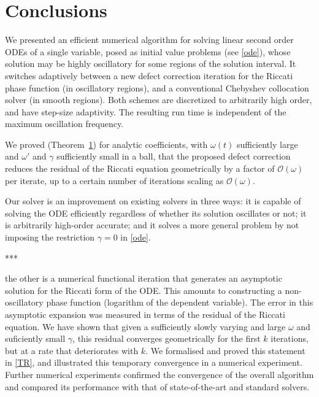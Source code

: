 \documentclass[10pt]{article}
\newcommand{\bigO}{{\mathcal O}}
\newcommand{\om}{\omega}
\newcommand{\g}{\gamma}
\begin{document}
\section{Conclusions \label{conclusions}}

We presented an efficient numerical algorithm for solving linear second order
ODEs of a single variable, posed as initial value problems (see \cref{ode}),
whose solution
may be highly oscillatory for some regions of the solution interval.
It switches adaptively between a new defect correction iteration for
the Riccati phase function (in oscillatory regions), and
a conventional Chebyshev collocation solver (in smooth regions).
Both schemes are discretized to arbitrarily high order, and
have step-size adaptivity.
The resulting run time is independent of the maximum oscillation frequency.

We proved (Theorem~\ref{}) for analytic coefficients, with
$\om(t)$ sufficiently large and $\om'$ and $\g$ sufficiently small in a ball,
that the proposed defect correction reduces the residual of the Riccati
equation geometrically by a factor of $\bigO(\om)$ per iterate,
up to a certain number of iterations scaling as $\bigO(\om)$.


Our solver is an improvement on existing solvers
in three ways: it is capable of solving the ODE efficiently regardless of
whether its solution oscillates or not; it is arbitrarily high-order accurate;
and it solves a more general problem by not imposing the restriction $\gamma =
0$ in \cref{ode}.

***

the other is a numerical functional iteration that generates an asymptotic
solution for the Riccati form of the ODE. This amounts to constructing a
non-oscillatory phase function (logarithm of the dependent
variable). The error in this asymptotic expansion was measured in terms of the
residual of the Riccati equation. We have shown that given a sufficiently
slowly varying and large $\om$ and suficiently small $\g$, this residual
converges geometrically for the first $k$ iterations, but at a rate that
deteriorates with $k$. We formalised and proved this statement in \cref{TR},
and illustrated this temporary convergence in a numerical experiment. Further
numerical experiments confirmed the convergence of the overall algorithm and
compared its performance with that of state-of-the-art and standard solvers.
\end{document}
